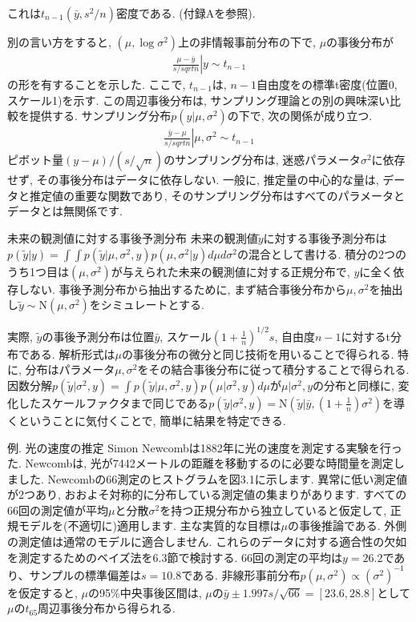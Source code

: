 \documentclass[10pt,dvipdfmx,a4]{beamer}
\newcommand{\eqn}[1]{\begin{align*}#1\end{align*}}
\begin{document}

\begin{frame}
これは$t_{n-1}(\bar{y},s^2/n)$密度である.
(付録Aを参照).

別の言い方をすると, $(\mu, \log \sigma^2)$上の非情報事前分布の下で, $\mu$の事後分布が
\eqn{\left.\frac{\mu-\bar{y}}{s/sqrt{n}}\right| y\sim t_{n-1}}
の形を有することを示した.
ここで, $t_{n-1}$は, $n-1$自由度をの標準t密度(位置0, スケール1)を示す.
この周辺事後分布は, サンプリング理論との別の興味深い比較を提供する.
サンプリング分布$p(y |\mu, \sigma^2)$の下で, 次の関係が成り立つ.
\eqn{\left.\frac{\bar{y}-\mu}{s/sqrt{n}}\right| \mu,\sigma^2\sim t_{n-1}}
ピボット量$(y - \mu)/(s /\sqrt{n})$のサンプリング分布は, 迷惑パラメータ$\sigma^2$に依存せず, その事後分布はデータに依存しない.
一般に, 推定量の中心的な量は, データと推定値の重要な関数であり, そのサンプリング分布はすべてのパラメータとデータとは無関係です.
\end{frame}


\begin{frame}{未来の観測値に対する事後予測分布}
未来の観測値$\tilde{y}$に対する事後予測分布は$p(\tilde{y}|y)=\int \int p(\tilde{y}|\mu,\sigma^2,y)p(\mu,\sigma^2|y)d\mu d\sigma^2$の混合として書ける.
積分の2つのうち1つ目は$(\mu,\sigma^2)$が与えられた未来の観測値に対する正規分布で, $y$に全く依存しない.
事後予測分布から抽出するために, まず結合事後分布から$\mu, \sigma^2$を抽出し$\tilde{y}\sim \text{N}(\mu,\sigma^2)$をシミュレートとする.

実際, $\tilde{y}$の事後予測分布は位置$\bar{y}$, スケール$(1+\tfrac{1}{n})^{1/2}s$, 自由度$n-1$に対するt分布である.
解析形式は$\mu$の事後分布の微分と同じ技術を用いることで得られる.
特に, 分布はパラメータ$\mu,\sigma^2$をその結合事後分布に従って積分することで得られる.
因数分解$p(\tilde{y}|\sigma^2, y)= \int p(\tilde{y}|\mu, \sigma^2,y)p(\mu|\sigma^2, y)d\mu$が$\mu|\sigma^2, y$の分布と同様に, 変化したスケールファクタまで同じである$p(\tilde{y}|\sigma^2, y)=\text{N}(\tilde{y} | \bar{y}, (1 +\tfrac{1}{n})\sigma^2)$を導くということに気付くことで, 簡単に結果を特定できる.
\end{frame}


\begin{frame}{例. 光の速度の推定}
Simon Newcombは1882年に光の速度を測定する実験を行った.
Newcombは, 光が7442メートルの距離を移動するのに必要な時間量を測定しました.
Newcombの66測定のヒストグラムを図3.1に示します.
異常に低い測定値が2つあり, おおよそ対称的に分布している測定値の集まりがあります.
すべての66回の測定値が平均$\mu$と分散$\sigma^2$を持つ正規分布から独立していると仮定して, 正規モデルを(不適切に)適用します.
主な実質的な目標は$\mu$の事後推論である.
外側の測定値は通常のモデルに適合しません.
これらのデータに対する適合性の欠如を測定するためのベイズ法を6.3節で検討する.
66回の測定の平均は$y = 26.2$であり、サンプルの標準偏差は$s = 10.8$である.
非線形事前分布$p(\mu,\sigma^2)\propto(\sigma^2)^{-1}$を仮定すると, $\mu$の95\%中央事後区間は, $\mu$の$\bar{y}\pm 1.997s/\sqrt{66}= [23.6,28.8]$として$\mu$の$t_{65}$周辺事後分布から得られる.
\end{frame}
\end{document}
